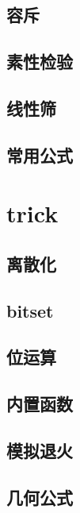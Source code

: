 \documentclass[twocolumn,a4]{article}
\newcommand{\addcpp}[1]{}
\begin{document}
	\subsection{容斥}
		\addcpp{math/rongchi.tex}
	\subsection{素性检验}
		\addcpp{math/prime_check.tex}
	\subsection{线性筛}
		\addcpp{math/sieve.tex}
	\subsection{常用公式}
		\addcpp{math/forulma.tex}
		
\section{trick}
	\subsection{离散化}
		\addcpp{trick/dirtri.tex}
	\subsection{bitset}
		\addcpp{trick/bitset.tex}
	\subsection{位运算}
		\addcpp{trick/bit.tex}
	\subsection{内置函数}
		\addcpp{trick/builtin.tex}
	\subsection{模拟退火}
		\addcpp{trick/mnth.tex}
	\subsection{几何公式}
		\addcpp{trick/geo.tex}
\end{document}
